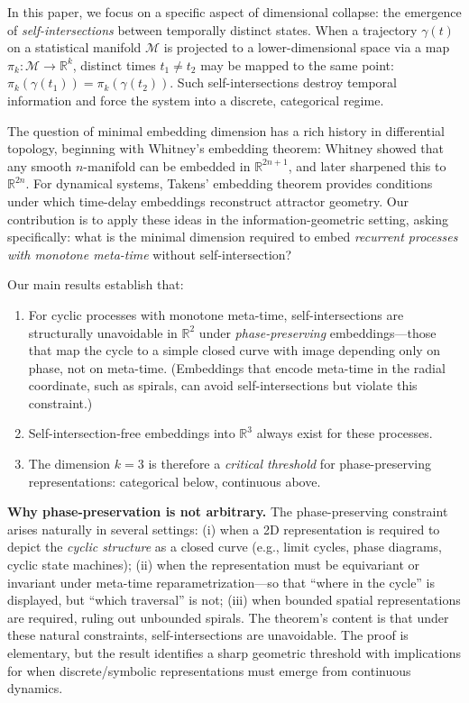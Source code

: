 \documentclass[12pt]{article}
\newcommand{\R}{\mathbb{R}}
\newcommand{\M}{\mathcal{M}}
\begin{document}
In this paper, we focus on a specific aspect of dimensional collapse: the emergence of \emph{self-intersections} between temporally distinct states. When a trajectory $\gamma(t)$ on a statistical manifold $\M$ is projected to a lower-dimensional space via a map $\pi_k: \M \to \R^k$, distinct times $t_1 \neq t_2$ may be mapped to the same point: $\pi_k(\gamma(t_1)) = \pi_k(\gamma(t_2))$. Such self-intersections destroy temporal information and force the system into a discrete, categorical regime.

The question of minimal embedding dimension has a rich history in differential topology, beginning with Whitney's embedding theorem: Whitney \citep{whitney1936manifolds} showed that any smooth $n$-manifold can be embedded in $\R^{2n+1}$, and later \citep{whitney1944selfintersections} sharpened this to $\R^{2n}$. For dynamical systems, Takens' embedding theorem \citep{takens1981detecting} provides conditions under which time-delay embeddings reconstruct attractor geometry. Our contribution is to apply these ideas in the information-geometric setting, asking specifically: what is the minimal dimension required to embed \emph{recurrent processes with monotone meta-time} without self-intersection?

Our main results establish that:
\begin{enumerate}
    \item For cyclic processes with monotone meta-time, self-intersections are structurally unavoidable in $\R^2$ under \emph{phase-preserving} embeddings---those that map the cycle to a simple closed curve with image depending only on phase, not on meta-time. (Embeddings that encode meta-time in the radial coordinate, such as spirals, can avoid self-intersections but violate this constraint.)
    \item Self-intersection-free embeddings into $\R^3$ always exist for these processes.
    \item The dimension $k = 3$ is therefore a \emph{critical threshold} for phase-preserving representations: categorical below, continuous above.
\end{enumerate}

\textbf{Why phase-preservation is not arbitrary.} The phase-preserving constraint arises naturally in several settings: (i) when a 2D representation is required to depict the \emph{cyclic structure} as a closed curve (e.g., limit cycles, phase diagrams, cyclic state machines); (ii) when the representation must be equivariant or invariant under meta-time reparametrization---so that ``where in the cycle'' is displayed, but ``which traversal'' is not; (iii) when bounded spatial representations are required, ruling out unbounded spirals. The theorem's content is that under these natural constraints, self-intersections are unavoidable. The proof is elementary, but the result identifies a sharp geometric threshold with implications for when discrete/symbolic representations must emerge from continuous dynamics.
\end{document}
